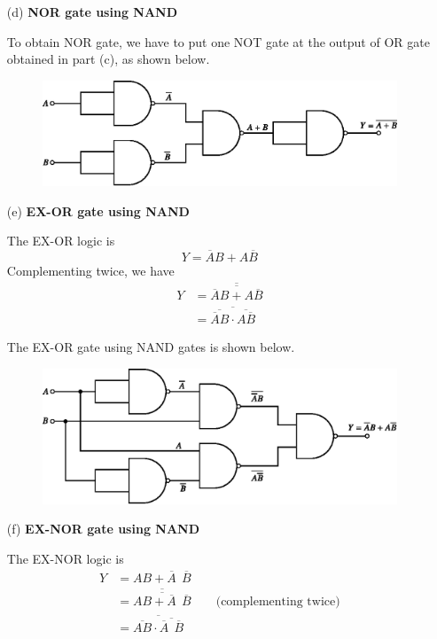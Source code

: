 \begin{solution}
\begin{itemize}
\item[(d)] {\bf NOR gate using NAND}

To obtain NOR gate, we have to put one NOT gate at the output of OR gate obtained in part (c), as shown below.
\begin{figure}[H]
\centering
\includegraphics{chap6/fig101.eps}
\end{figure}

\item[(e)] {\bf EX-OR gate using NAND}

The EX-OR logic is
$$
Y=\overline{A}B+A\overline{B}
$$
Complementing twice, we have
\begin{align*}
Y &= \overline{\overline{\overline{A}B+A\overline{B}}}\\[3pt]
  &= \overline{\overline{\overline{A}B}\cdot \overline{A\overline{B}}}
\end{align*}

The EX-OR gate using NAND gates is shown below.
\begin{figure}[H]
\centering
\includegraphics{chap6/fig102.eps}
\end{figure}

\eject

\item[(f)] {\bf EX-NOR gate using NAND}

The EX-NOR logic is
\begin{align*}
Y &= AB+\overline{A} \ \ \overline{B}\\[3pt]
&= \overline{\overline{AB+\overline{A} \ \ \overline{B}}}\qquad \text{(complementing twice)}\\[3pt]
&= \overline{\overline{AB}\cdot \overline{\overline{A} \ \ \overline{B}}}
\end{align*}


\end{itemize}
\end{solution}
